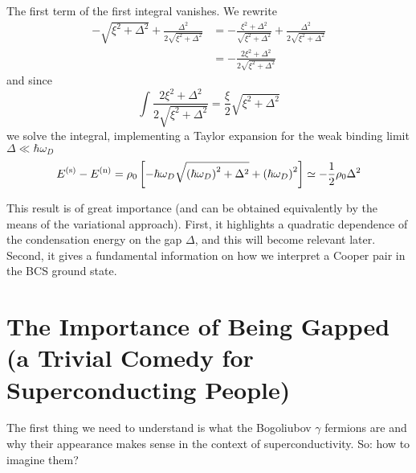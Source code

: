 The first term of the first integral vanishes. We rewrite
\[
\begin{aligned}
	- \sqrt{\xi^2 + \Delta^2} + \frac{\Delta^2}{2\sqrt{\xi^2 + \Delta^2}} &= - \frac{\xi^2 + \Delta^2}{\sqrt{\xi^2 + \Delta^2}} + \frac{\Delta^2}{2\sqrt{\xi^2 + \Delta^2}}\\
	&= - \frac{2\xi^2 + \Delta^2}{2\sqrt{\xi^2 + \Delta^2}}
\end{aligned}
\]
and since
\[
	\int \frac{2\xi^2 + \Delta^2}{2\sqrt{\xi^2 + \Delta^2}} = \frac{\xi}{2} \sqrt{\xi^2 + \Delta^2}
\]
we solve the integral, implementing a Taylor expansion for the weak binding limit $\Delta\ll\hbar\omega_D$
\[
	E^{(\mathrm{s})} - E^{(\mathrm{n})} = \rho_0 \left[{-\hbar\omega_D\sqrt{\left({\hbar\omega_D}\right)^2 + \Delta^2} + \left({\hbar\omega_D}\right)^2}\right] \simeq - \frac{1}{2} \rho_0 \Delta^2
\]

This result is of great importance (and can be obtained equivalently by the means of the variational approach). First, it highlights a quadratic dependence of the condensation energy on the gap $\Delta$, and this will become relevant later. Second, it gives a fundamental information on how we interpret a Cooper pair in the BCS ground state.

\begin{figure}
	\centering
	
	\caption{}
	\label{fig:condensation energy shell}
\end{figure}

%

\section[The Importance of Being Gapped]{The Importance of Being Gapped \newline \small (a Trivial Comedy for Superconducting People)}\label{sec:the importance of being gapped}

The first thing we need to understand is what the Bogoliubov $\gamma$ fermions are and why their appearance makes sense in the context of superconductivity. So: how to imagine them?

